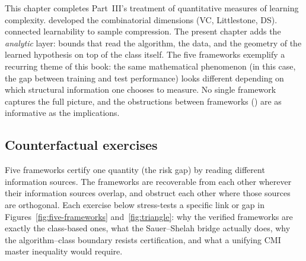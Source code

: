 
\bigskip

\begin{remark}
This chapter completes Part~III's treatment of quantitative measures of
learning complexity.   developed the combinatorial
dimensions (VC, Littlestone, DS).   connected
learnability to sample compression.  The present chapter adds the
\emph{analytic} layer: bounds that read the algorithm, the data, and the
geometry of the learned hypothesis on top of the class itself.
The five frameworks exemplify a recurring theme of this book: the same
mathematical phenomenon (in this case, the gap between training and
test performance) looks different depending on which structural
information one chooses to measure.  No single framework captures the
full picture, and the obstructions between frameworks ()
are as informative as the implications.
\end{remark}

\subsection*{Counterfactual exercises}

Five frameworks certify one quantity (the risk gap) by reading different information sources. The frameworks are recoverable from each other wherever their information sources overlap, and obstruct each other where those sources are orthogonal. Each exercise below stress-tests a specific link or gap in Figures~\ref{fig:five-frameworks} and~\ref{fig:triangle}: why the verified frameworks are exactly the class-based ones, what the Sauer--Shelah bridge actually does, why the algorithm--class boundary resists certification, and what a unifying CMI master inequality would require.

